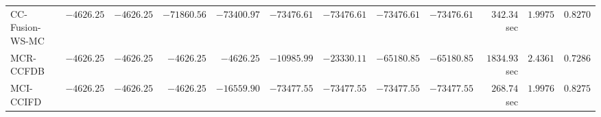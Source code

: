 \begin{table}[H]
\begin{tabular}{lrrrrrrrrrrr}
     CC-Fusion-WS-MC & $     -4626.25$ & $     -4626.25$ & $    -71860.56$ & $    -73400.97$ & $    -73476.61$ & $    -73476.61$ & $    -73476.61$ & $    -73476.61$ & $       342.34$ sec    & $       1.9975$  & $       0.8270$ \\ 
\cmidrule{1-1} 
           MCR-CCFDB & $     -4626.25$ & $     -4626.25$ & $     -4626.25$ & $     -4626.25$ & $    -10985.99$ & $    -23330.11$ & $    -65180.85$ & $    -65180.85$ & $      1834.93$ sec    & $       2.4361$  & $       0.7286$ \\ 
\cmidrule{1-1} 
           MCI-CCIFD & $     -4626.25$ & $     -4626.25$ & $     -4626.25$ & $    -16559.90$ & $    -73477.55$ & $    -73477.55$ & $    -73477.55$ & $    -73477.55$ & $       268.74$ sec    & $       1.9976$  & $       0.8275$ \\ 
\bottomrule
\end{tabular}
\end{table}

